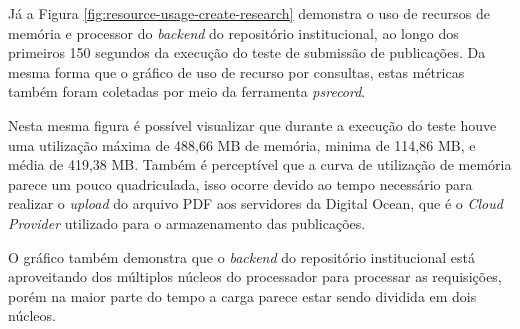 Já a Figura \ref{fig:resource-usage-create-research} demonstra o uso de recursos
de memória e processor do \emph{backend} do repositório institucional, ao longo
dos primeiros 150 segundos da execução do teste de submissão de publicações.
Da mesma forma que o gráfico de uso de recurso por consultas, estas métricas
também foram coletadas por meio da ferramenta \emph{psrecord}.

Nesta mesma figura é possível visualizar que durante a execução do teste houve uma
utilização máxima de 488,66 MB de memória, minima de 114,86 MB, e média de 419,38 MB.
Também é perceptível que a curva de utilização de memória parece um pouco quadriculada,
isso ocorre devido ao tempo necessário para realizar o \emph{upload} do arquivo PDF
aos servidores da Digital Ocean, que é o \emph{Cloud Provider} utilizado para o
armazenamento das publicações.

O gráfico também demonstra que o \emph{backend} do repositório institucional
está aproveitando dos múltiplos núcleos do processador para processar as requisições,
porém na maior parte do tempo a carga parece estar sendo dividida em dois núcleos.
